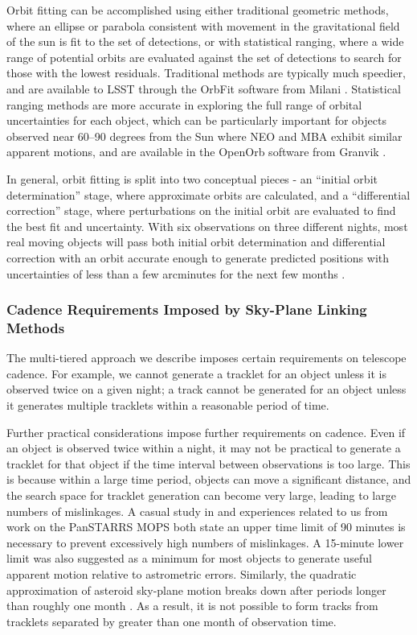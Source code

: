 \documentclass[12pt,preprint]{aastex}
\begin{document}
Orbit fitting can be accomplished using either traditional geometric
methods, where an ellipse or parabola consistent with movement in the
gravitational field of the sun is fit to the set of detections, or
with statistical ranging, where a wide range of potential orbits are
evaluated against the set of detections to search for those with
the lowest residuals. Traditional methods are typically much speedier,
and are available to LSST through the OrbFit software from Milani
\citep{Milani2006}. Statistical ranging methods are more accurate in
exploring the full range of orbital uncertainties for each object,
which can be particularly important for objects observed near 60--90
degrees from the Sun where NEO and MBA exhibit similar apparent
motions, and are available in the OpenOrb software from Granvik
\citep{OpenOrb2009}.

In general, orbit fitting is split into two conceptual pieces - an
``initial orbit determination'' stage, where approximate orbits are
calculated, and a ``differential correction'' stage, where
perturbations on the initial orbit are evaluated to find the best fit
and uncertainty. With six observations on three different nights, most
real moving objects will pass both initial orbit determination and
differential correction with an orbit accurate enough to generate
predicted positions with uncertainties of less than a few arcminutes
for the next few months \citep{basicSolarSystem}.



\subsubsection{Cadence Requirements Imposed by Sky-Plane Linking Methods}
\label{cadenceRequirements}
The multi-tiered approach we describe imposes certain requirements on
telescope cadence.  For example, we cannot generate a tracklet for an
object unless it is observed twice on a given night; a track cannot be
generated for an object unless it generates multiple tracklets within
a reasonable period of time.

Further practical considerations impose further requirements on
cadence. Even if an object is observed twice within a night, it may
not be practical to generate a tracklet for that object if the time
interval between observations is too large.  This is because within a
large time period, objects can move a significant distance, and the
search space for tracklet generation can become very large, leading to
large numbers of mislinkages.  A casual study in \citet{kubica_thesis}
and experiences related to us from work on the PanSTARRS MOPS both
state an upper time limit of 90 minutes is necessary to prevent
excessively high numbers of mislinkages. A 15-minute lower limit was
also suggested as a minimum for most objects to generate useful
apparent motion relative to astrometric errors. Similarly, the
quadratic approximation of asteroid sky-plane motion breaks down after
periods longer than roughly one month \citep{kubica_thesis}.  As a
result, it is not possible to form tracks from tracklets separated by
greater than one month of observation time.
\end{document}
